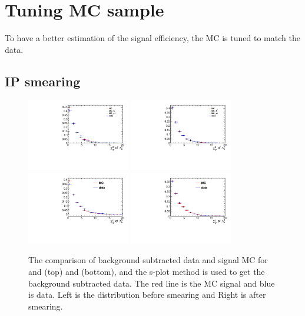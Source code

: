 
\section{Tuning MC sample}
\label{sec:tuningMC}
To have a better estimation of the signal efficiency, 
the MC is tuned to match the data.

\subsection{IP smearing}

\begin{figure}[bth]
\centering
\includegraphics[width=0.4\textwidth]{Figures/05_open_charm/04_tune/Lckkpi_smear/before/Lb_IPCHI2_OWNPV.pdf}%
\includegraphics[width=0.4\textwidth]{Figures/05_open_charm/04_tune/Lckkpi_smear/after/Lb_IPCHI2_OWNPV.pdf}\\%
\includegraphics[width=0.4\textwidth]{Figures/05_open_charm/04_tune/LcDs_smear/before/Lb_IPCHI2_OWNPV.pdf}
\includegraphics[width=0.4\textwidth]{Figures/05_open_charm/04_tune/LcDs_smear/after/Lb_IPCHI2_OWNPV.pdf}
\caption{The comparison of background subtracted data and signal MC for and \LbLckkpi(top) and \LbLcDs(bottom), and the s-plot method is used to get the background subtracted data. The red line is the MC signal and blue is data. Left is the distribution before smearing and Right is after smearing.}
\label{Fig.diff_cut_value_pi}
\end{figure}

